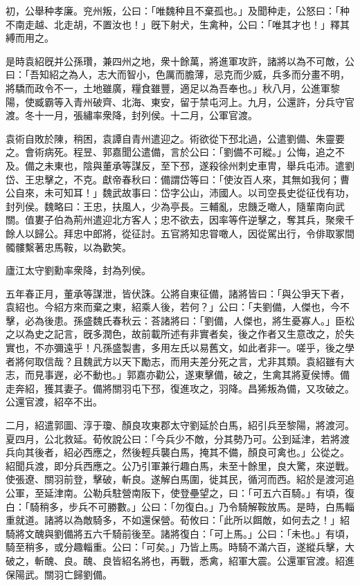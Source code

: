 \begin{pinyinscope}
初，公舉种孝廉。兖州叛，公曰：「唯魏种且不棄孤也。」及聞种走，公怒曰：「种不南走越、北走胡，不置汝也！」旣下射犬，生禽种，公曰：「唯其才也！」釋其縛而用之。

是時袁紹旣并公孫瓚，兼四州之地，衆十餘萬，將進軍攻許，諸將以為不可敵，公曰：「吾知紹之為人，志大而智小，色厲而膽薄，忌克而少威，兵多而分畫不明，將驕而政令不一，土地雖廣，糧食雖豐，適足以為吾奉也。」秋八月，公進軍黎陽，使臧霸等入青州破齊、北海、東安，留于禁屯河上。九月，公還許，分兵守官渡。冬十一月，張繡率衆降，封列侯。十二月，公軍官渡。

袁術自敗於陳，稍困，袁譚自青州遣迎之。術欲從下邳北過，公遣劉備、朱靈要之。會術病死。程昱、郭嘉聞公遣備，言於公曰：「劉備不可縱。」公悔，追之不及。備之未東也，陰與董承等謀反，至下邳，遂殺徐州刺史車冑，舉兵屯沛。遣劉岱、王忠擊之，不克。獻帝春秋曰：備謂岱等曰：「使汝百人來，其無如我何；曹公自來，未可知耳！」魏武故事曰：岱字公山，沛國人。以司空長史從征伐有功，封列侯。魏略曰：王忠，扶風人，少為亭長。三輔亂，忠饑乏噉人，隨輩南向武關。值婁子伯為荊州遣迎北方客人；忠不欲去，因率等仵逆擊之，奪其兵，聚衆千餘人以歸公。拜忠中郎將，從征討。五官將知忠甞噉人，因從駕出行，令俳取冢間髑髏繫著忠馬鞍，以為歡笑。

廬江太守劉勳率衆降，封為列侯。

五年春正月，董承等謀泄，皆伏誅。公將自東征備，諸將皆曰：「與公爭天下者，袁紹也。今紹方來而棄之東，紹乘人後，若何？」公曰：「夫劉備，人傑也，今不擊，必為後患。孫盛魏氏春秋云：荅諸將曰：「劉備，人傑也，將生憂寡人。」臣松之以為史之記言，旣多潤色，故前載所述有非實者矣，後之作者又生意改之，於失實也，不亦彌遠乎！凡孫盛製書，多用左氏以易舊文，如此者非一。嗟乎，後之學者將何取信哉？且魏武方以天下勵志，而用夫差分死之言，尤非其類。袁紹雖有大志，而見事遟，必不動也。」郭嘉亦勸公，遂東擊備，破之，生禽其將夏侯博。備走奔紹，獲其妻子。備將關羽屯下邳，復進攻之，羽降。昌狶叛為備，又攻破之。公還官渡，紹卒不出。

二月，紹遣郭圖、淳于瓊、顏良攻東郡太守劉延於白馬，紹引兵至黎陽，將渡河。夏四月，公北救延。荀攸說公曰：「今兵少不敵，分其勢乃可。公到延津，若將渡兵向其後者，紹必西應之，然後輕兵襲白馬，掩其不備，顏良可禽也。」公從之。紹聞兵渡，即分兵西應之。公乃引軍兼行趣白馬，未至十餘里，良大驚，來逆戰。使張遼、關羽前登，擊破，斬良。遂解白馬圍，徙其民，循河而西。紹於是渡河追公軍，至延津南。公勒兵駐營南阪下，使登壘望之，曰：「可五六百騎。」有頃，復白：「騎稍多，步兵不可勝數。」公曰：「勿復白。」乃令騎解鞍放馬。是時，白馬輜重就道。諸將以為敵騎多，不如還保營。荀攸曰：「此所以餌敵，如何去之！」紹騎將文醜與劉備將五六千騎前後至。諸將復白：「可上馬。」公曰：「未也。」有頃，騎至稍多，或分趣輜重。公曰：「可矣。」乃皆上馬。時騎不滿六百，遂縱兵擊，大破之，斬醜、良。醜、良皆紹名將也，再戰，悉禽，紹軍大震。公還軍官渡。紹進保陽武。關羽亡歸劉備。


\end{pinyinscope}
